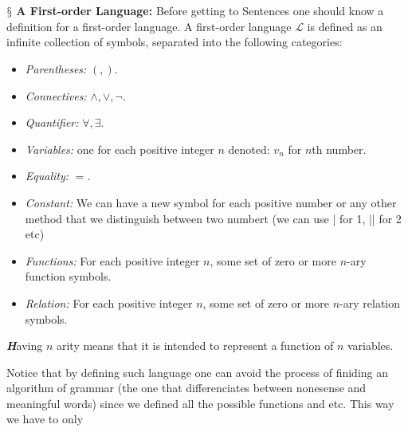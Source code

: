 \documentclass[10pt,a4paper]{article}
\newenvironment{callout}
	{\begin{calloutbox}\color{charcoal}\textbf\textit}
	{\end{calloutbox}}
\newcommand{\newpoint}[1]{\indent$\mathsection$ \textbf{#1}}
\newcommand{\curveL}{\mathcal{L}}
\begin{document}
                    \\
                    \\
                    \newpoint{A First-order Language:} Before getting to Sentences one should know a definition for a first-order language. A first-order language $\curveL$ is defined as an infinite collection of symbols, separated into the following categories:
                    \begin{itemize}
                        \item \textit{Parentheses:} $(,)$.
                        \item \textit{Connectives:} $\land, \lor, \neg$.
                        \item \textit{Quantifier:} $\forall, \exists$.
                        \item \textit{Variables:} one for each positive integer $n$ denoted: $v_n$ for $n$th number.
                        \item \textit{Equality:} $=$.
                        \item \textit{Constant:} We can have a new symbol for each positive number or any other method that we distinguish between two numbert (we can use | for 1, || for 2 etc)
                        \item \textit{Functions:} For each positive integer $n$, some set of zero or more $n$-ary function symbols.
                        \item \textit{Relation:} For each positive integer $n$, some set of zero or more $n$-ary relation symbols.
                    \end{itemize}
                    \begin{callout}
                        Having $n$ arity means that it is intended to represent a function of $n$ variables.
                    \end{callout}
                    Notice that by defining such language one can avoid the process of finiding an algorithm of grammar (the one that differenciates between nonesense and meaningful words) since we defined all the possible functions and etc. This way we have to only
\end{document}
